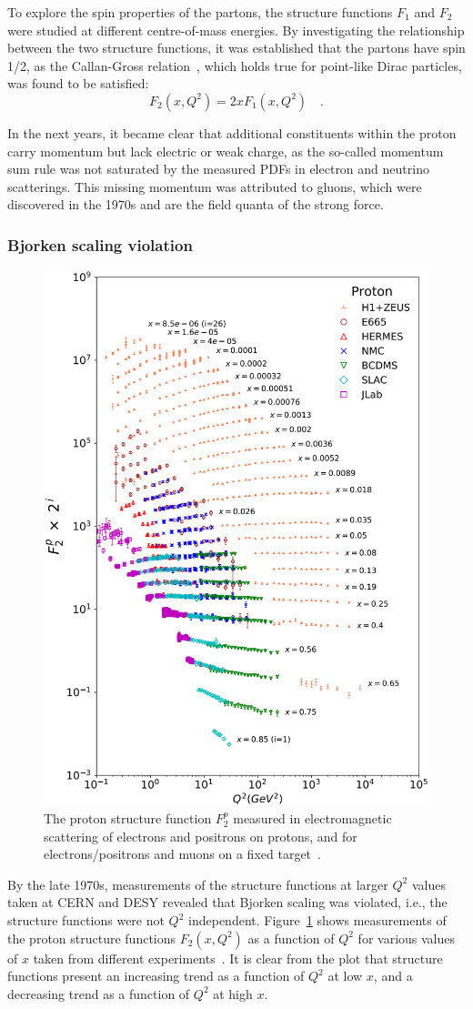 To explore the spin properties of the partons, the structure functions $F_1$ and $F_2$ were studied at different centre-of-mass energies. By investigating the relationship between the two structure functions, it was established that the partons have spin 1/2, as the Callan-Gross relation~\cite{Callan:1969uq}, which holds true for point-like Dirac particles, was found to be satisfied:
\begin{equation*}
    F_2(x,Q^2) = 2x F_1(x,Q^2)\quad .
\end{equation*}

In the next years, it became clear that additional constituents within the proton carry momentum but lack electric or weak charge, as the so-called momentum sum rule was not saturated by the measured PDFs in electron and neutrino scatterings. This missing momentum was attributed to gluons, which were discovered in the 1970s and are the field quanta of the strong force.

\subsubsection{Bjorken scaling violation}
\begin{figure}[htb]
    \centering
    \includegraphics[width=0.6\linewidth]{Figures/Chapter 2/F2Results.png}
    \caption{The proton structure function $F^p_2$ measured in electromagnetic scattering of electrons and positrons on protons, and for electrons/positrons and muons on a fixed target~\cite{pdg}.}
    \label{fig:scaling_violation}
\end{figure}
By the late 1970s, measurements of the structure functions at larger $Q^2$ values taken at CERN and DESY revealed that Bjorken scaling was violated, i.e., the structure functions were not $Q^2$ independent. Figure~\ref{fig:scaling_violation} shows measurements of the proton structure functions $F_2(x,Q^2)$ as a function of $Q^2$ for various values of $x$ taken from different experiments~\cite{pdg}. It is clear from the plot that structure functions present an increasing trend as a function of $Q^2$ at low $x$, and a decreasing trend as a function of $Q^2$ at high $x$. 

